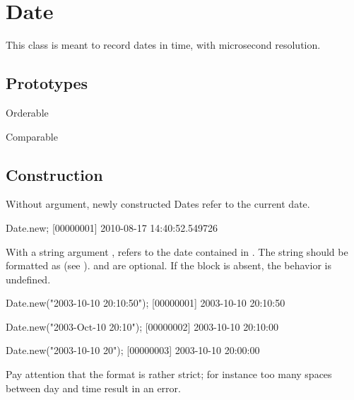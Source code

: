 
\section{Date}

This class is meant to record dates in time, with microsecond resolution.
\experimental{}

\subsection{Prototypes}
\begin{refObjects}
\item[Orderable]
\item[Comparable]
\end{refObjects}

\subsection{Construction}

Without argument, newly constructed Dates refer to the current date.

\begin{urbiunchecked}[firstnumber=1]
Date.new;
[00000001] 2010-08-17 14:40:52.549726
\end{urbiunchecked}

With a string argument , refers to the date contained in .
The string should be formatted as  (see ).  and
 are optional. If the block  is
absent, the behavior is undefined.


\begin{urbiscript}
Date.new("2003-10-10 20:10:50");
[00000001] 2003-10-10 20:10:50

Date.new("2003-Oct-10 20:10");
[00000002] 2003-10-10 20:10:00

Date.new("2003-10-10 20");
[00000003] 2003-10-10 20:00:00
\end{urbiscript}

Pay attention that the format is rather strict; for instance too many spaces
between day and time result in an error.


